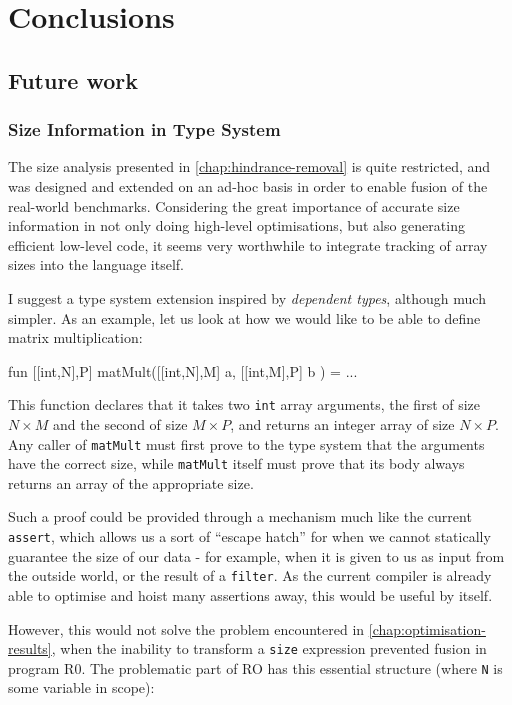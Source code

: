 \chapter{Conclusions}
\label{chap:conclusions}

\section{Future work}
\label{sec:future-work}

\subsection{Size Information in Type System}

The size analysis presented in \cref{chap:hindrance-removal} is quite
restricted, and was designed and extended on an ad-hoc basis in order
to enable fusion of the real-world benchmarks.  Considering the great
importance of accurate size information in not only doing high-level
optimisations, but also generating efficient low-level code, it seems
very worthwhile to integrate tracking of array sizes into the language
itself.

I suggest a type system extension inspired by \textit{dependent
  types}, although much simpler.  As an example, let us look at how we
would like to be able to define matrix multiplication:

\begin{colorcode}
fun [[int,N],P] matMult([[int,N],M] a, [[int,M],P] b ) =
  ...
\end{colorcode}

This function declares that it takes two \texttt{int} array arguments,
the first of size $N \times M$ and the second of size $M \times P$,
and returns an integer array of size $N \times P$.  Any caller of
\texttt{matMult} must first prove to the type system that the
arguments have the correct size, while \texttt{matMult} itself must
prove that its body always returns an array of the appropriate size.

Such a proof could be provided through a mechanism much like the
current \texttt{assert}, which allows us a sort of ``escape hatch''
for when we cannot statically guarantee the size of our data - for
example, when it is given to us as input from the outside world, or
the result of a \texttt{filter}.  As the current \LO{} compiler is
already able to optimise and hoist many assertions away, this would be
useful by itself.

However, this would not solve the problem encountered in
\cref{chap:optimisation-results}, when the inability to transform a
\texttt{size} expression prevented fusion in program R0.  The
problematic part of RO has this essential structure (where \texttt{N}
is some variable in scope):

